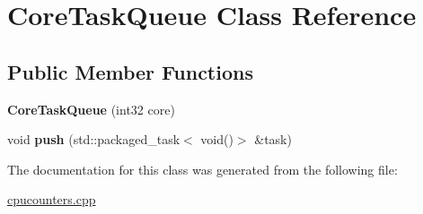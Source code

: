 \hypertarget{class_core_task_queue}{}\section{Core\+Task\+Queue Class Reference}
\label{class_core_task_queue}
\subsection*{Public Member Functions}
\begin{DoxyCompactItemize}
\item 
\mbox{\label{class_core_task_queue_ae0748611bfea1406cdcae5469e6983ec}} 
{\bfseries Core\+Task\+Queue} (int32 core)
\item 
\mbox{\label{class_core_task_queue_affede6b8b5d78bbf64214f7a2f2badaf}} 
void {\bfseries push} (std\+::packaged\+\_\+task$<$ void()$>$ \&task)
\end{DoxyCompactItemize}


The documentation for this class was generated from the following file\+:\begin{DoxyCompactItemize}
\item 
\mbox{\hyperlink{cpucounters_8cpp}{cpucounters.\+cpp}}\end{DoxyCompactItemize}
